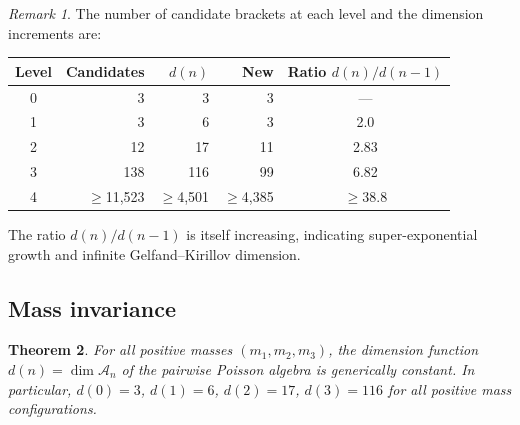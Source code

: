 \documentclass[11pt,a4paper]{article}
\newtheorem{theorem}{Theorem}
\theoremstyle{remark}
\newtheorem{remark}[theorem]{Remark}
\newcommand{\cA}{\mathcal{A}}
\begin{document}
\begin{remark}
The number of candidate brackets at each level and the
dimension increments are:
\begin{center}
\begin{tabular}{@{}crrrc@{}}
\toprule
Level & Candidates & $d(n)$ & New & Ratio $d(n)/d(n{-}1)$ \\
\midrule
0 & 3 & 3 & 3 & --- \\
1 & 3 & 6 & 3 & 2.0 \\
2 & 12 & 17 & 11 & 2.83 \\
3 & 138 & 116 & 99 & 6.82 \\
4 & $\ge$11,523 & $\ge$4,501 & $\ge$4,385 & $\ge$38.8 \\
\bottomrule
\end{tabular}
\end{center}
The ratio $d(n)/d(n{-}1)$ is itself increasing, indicating
super-exponential growth and infinite Gelfand--Kirillov dimension.
\end{remark}

\subsection{Mass invariance}

\begin{theorem}\label{thm:mass-inv}
For all positive masses $(m_1, m_2, m_3)$, the dimension function
$d(n) = \dim \cA_n$ of the pairwise Poisson algebra is generically
constant.  In particular, $d(0)=3$, $d(1)=6$, $d(2)=17$, $d(3)=116$
for all positive mass configurations.
\end{theorem}
\end{document}
